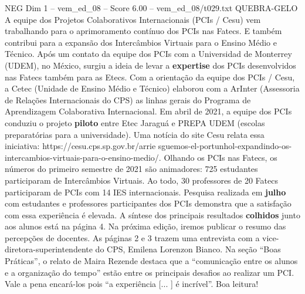 \begin{textsample}{NEG Dim 1 – vem\_ed\_08 – Score 6.00 – vem\_ed\_08/t029.txt}  \label{ex:f1_neg_122}
QUEBRA-GELO A equipe dos Projetos Colaborativos Internacionais (PCIs / Cesu) vem trabalhando para o aprimoramento contínuo dos PCIs nas Fatecs.
E também contribui para a expansão dos Intercâmbios Virtuais para o Ensino Médio e Técnico.
Após um contato da equipe dos PCIs com a Universidad de Monterrey (UDEM), no México, surgiu a ideia de levar a \textbf{expertise} dos PCIs desenvolvidos nas Fatecs também para as Etecs.
Com a orientação da equipe dos PCIs / Cesu, a Cetec (Unidade de Ensino Médio e Técnico) elaborou com a ArInter (Assessoria de Relações Internacionais do CPS) as linhas gerais do Programa de Aprendizagem Colaborativa Internacional.
Em abril de 2021, a equipe dos PCIs conduziu o projeto \textbf{piloto} entre Etec Jaraguá e PREPA UDEM (escolas preparatórias para a universidade).
Uma notícia do site Cesu relata essa iniciativa: https://cesu.cps.sp.gov.br/arrie sguemos-el-portunhol-expandindo-os-intercambios-virtuais-para-o-ensino-medio/.
Olhando os PCIs nas Fatecs, os números do primeiro semestre de 2021 são animadores: 725 estudantes participaram de Intercâmbios Virtuais.
Ao todo, 30 professores de 20 Fatecs participaram de PCIs com 14 IES internacionais.
Pesquisa realizada em \textbf{julho} com estudantes e professores participantes dos PCIs demonstra que a satisfação com essa experiência é elevada.
A síntese dos principais resultados \textbf{colhidos} junto aos alunos está na página 4.
Na próxima edição, iremos publicar o resumo das percepções de docentes.
As páginas 2 e 3 trazem uma entrevista com a vice-diretora-superintendente do CPS, Emilena Lorenzon Bianco.
Na seção “Boas Práticas”, o relato de Maira Rezende destaca que a “comunicação entre os alunos e a organização do tempo” estão entre os principais desafios ao realizar um PCI.
Vale a pena encará-los pois “a experiência [... ] é incrível”.
Boa leitura!

\end{textsample}
